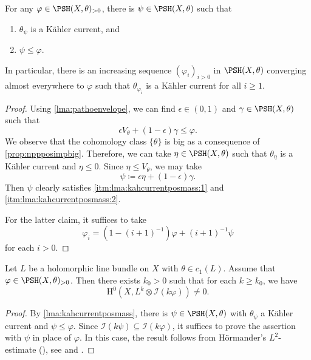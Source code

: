 \begin{lemma}\label{lma:kahcurrentposmass}
    For any $\varphi\in \PSH(X,\theta)_{>0}$, there is $\psi\in \PSH(X,\theta)$ such that
    \begin{enumerate}
        \item\label{itm:lma:kahcurrentposmass:1} $\theta_{\psi}$ is a Kähler current, and
        \item\label{itm:lma:kahcurrentposmass:2} $\psi\leq \varphi$.
    \end{enumerate}
    In particular, there is an increasing sequence $(\varphi_i)_{i>0}$ in $\PSH(X,\theta)$ converging almost everywhere to $\varphi$ such that $\theta_{\varphi_i}$ is a K\"ahler current for all $i\geq 1$.
\end{lemma}
\begin{proof}
    Using \cref{lma:pathoenvelope}, we can find $\epsilon\in (0,1)$ and $\gamma\in \PSH(X,\theta)$ such that
    \[
    \epsilon V_{\theta}+(1-\epsilon)\gamma\leq \varphi.
    \]
    We observe that the cohomology class $\{\theta\}$ is big as a consequence of \cref{prop:nppposimpbig}. Therefore, we can take $\eta\in \PSH(X,\theta)$ such that $\theta_{\eta}$ is a Kähler current and $\eta\leq 0$. Since $\eta\leq V_{\theta}$, we may take
    \[
    \psi\coloneqq \epsilon\eta+(1-\epsilon)\gamma.
    \]
    Then $\psi$ clearly satisfies \ref{itm:lma:kahcurrentposmass:1} and \ref{itm:lma:kahcurrentposmass:2}.

    For the latter claim, it suffices to take
    \[
    \varphi_i=\left(1-(i+1)^{-1}\right)\varphi +(i+1)^{-1}\psi
    \]
    for each $i>0$.
\end{proof}

\begin{lemma}\label{lma:existsecposmass}
    Let $L$ be a holomorphic line bundle on $X$ with $\theta\in c_1(L)$. Assume that $\varphi\in \PSH(X,\theta)_{>0}$. Then there exists $k_0>0$ such that for each $k\geq k_0$, we have
    \[
        \mathrm{H}^0\left(X,L^k\otimes \mathcal{I}(k\varphi)\right)\neq 0.
    \]
\end{lemma}

\begin{proof}
    By \cref{lma:kahcurrentposmass}, there is $\psi\in \PSH(X,\theta)$ with $\theta_{\psi}$ a Kähler current and $\psi\leq\varphi$. Since $\mathcal{I}(k\psi)\subseteq \mathcal{I}(k\varphi)$, it suffices to prove the assertion with $\psi$ in place of $\varphi$. In this case, the result follows from Hörmander's $L^2$-estimate (\cite{Hor66}), see \cite[Theorem~13.21]{Dem12} and \cite[Lemma~14.6.5 and Theorem~14.6.7]{FPT}.
\end{proof}


